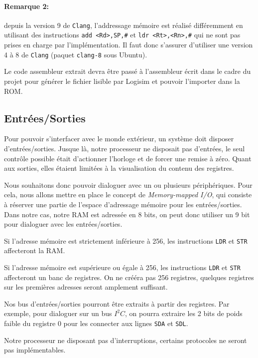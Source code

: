 \documentclass{article}
\begin{document}
    \paragraph{Remarque 2:} depuis la version 9 de \texttt{Clang}, l'addressage mémoire est réalisé différemment en utilisant des instructions \texttt{add <Rd>,SP,\#<imm8>} et \texttt{ldr <Rt>,<Rn>,\#<imm5>} qui ne sont pas prises en charge par l'implémentation.
    Il faut donc s'assurer d'utiliser une version 4 à 8 de \texttt{Clang} (paquet \texttt{clang-8} sous Ubuntu).

    Le code assembleur extrait devra être passé à l'assembleur écrit dans le cadre du projet pour générer le fichier lisible par Logisim et pouvoir l'importer dans la ROM.

    \subsection{Entrées/Sorties}

    Pour pouvoir s'interfacer avec le monde extérieur, un système doit disposer d'entrées/sorties.
    Jusque là, notre processeur ne disposait pas d'entrées, le seul contrôle possible était d'actionner l'horloge et de forcer une remise à zéro.
    Quant aux sorties, elles étaient limitées à la visualisation du contenu des registres.

    Nous souhaitons donc pouvoir dialoguer avec un ou plusieurs périphériques.
    Pour cela, nous allons mettre en place le concept de \textit{Memory-mapped I/O}, qui consiste à réserver une partie de l'espace d'adressage mémoire pour les entrées/sorties.
    Dans notre cas, notre RAM est adressée en 8 bits, on peut donc utiliser un 9\ieme {} bit pour dialoguer avec les entrées/sorties.

    Si l'adresse mémoire est strictement inférieure à 256, les instructions \texttt{LDR} et \texttt{STR} affecteront la RAM.

    Si l'adresse mémoire est supérieure ou égale à 256, les instructions \texttt{LDR} et \texttt{STR} affecteront un banc de registres.
    On ne crééra pas 256 registres, quelques registres sur les premières adresses seront amplement suffisant.

    Nos bus d'entrées/sorties pourront être extraits à partir des registres.
    Par exemple, pour dialoguer sur un bus $I^2C$, on pourra extraire les 2 bits de poids faible du registre 0 pour les connecter aux lignes \texttt{SDA} et \texttt{SDL}.

    Notre processeur ne disposant pas d'interruptions, certains protocoles ne seront pas implémentables.
\end{document}
